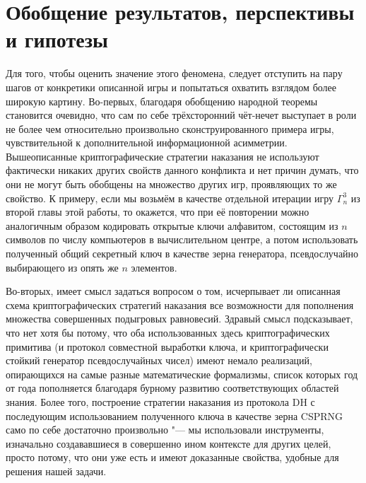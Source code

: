 \section{Обобщение результатов, перспективы и гипотезы}\label{sec:ch3/sect6}

Для того, чтобы оценить значение этого феномена, следует отступить на пару шагов от конкретики описанной игры и попытаться охватить взглядом более широкую картину. Во-первых, благодаря обобщению народной теоремы становится очевидно, что сам по себе трёхсторонний чёт-нечет выступает в роли не более чем относительно произвольно сконструированного примера игры, чувствительной к дополнительной информационной асимметрии. Вышеописанные криптографические стратегии наказания не используют фактически никаких других свойств данного конфликта и нет причин думать, что они не могут быть обобщены на множество других игр, проявляющих то же свойство. К примеру, если мы возьмём в качестве отдельной итерации игру $\Gamma^3_n$ из второй главы этой работы, то окажется, что при её повторении можно аналогичным образом кодировать открытые ключи алфавитом, состоящим из $n$ символов по числу компьютеров в вычислительном центре, а потом использовать полученный общий секретный ключ в качестве зерна генератора, псевдослучайно выбирающего из опять же $n$ элементов.

Во-вторых, имеет смысл задаться вопросом о том, исчерпывает ли описанная схема криптографических стратегий наказания все возможности для пополнения множества совершенных подыгровых равновесий. Здравый смысл подсказывает, что нет хотя бы потому, что оба использованных здесь криптографических примитива (и протокол совместной выработки ключа, и криптографически стойкий генератор псевдослучайных чисел) имеют немало реализаций, опирающихся на самые разные математические формализмы, список которых год от года пополняется благодаря бурному развитию соответствующих областей знания. Более того, построение стратегии наказания из протокола DH с последующим использованием полученного ключа в качестве зерна CSPRNG само по себе достаточно произвольно "--- мы использовали инструменты, изначально создававшиеся в совершенно ином контексте для других целей, просто потому, что они уже есть и имеют доказанные свойства, удобные для решения нашей задачи.

